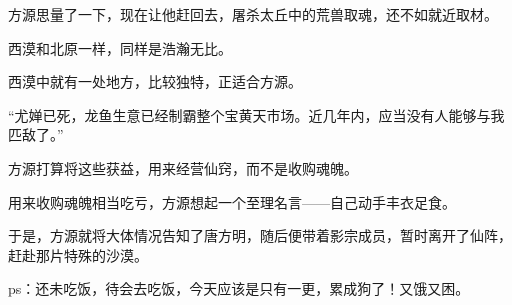 \begin{this_body}
方源思量了一下，现在让他赶回去，屠杀太丘中的荒兽取魂，还不如就近取材。

西漠和北原一样，同样是浩瀚无比。

西漠中就有一处地方，比较独特，正适合方源。

“尤婵已死，龙鱼生意已经制霸整个宝黄天市场。近几年内，应当没有人能够与我匹敌了。”

方源打算将这些获益，用来经营仙窍，而不是收购魂魄。

用来收购魂魄相当吃亏，方源想起一个至理名言——自己动手丰衣足食。

于是，方源就将大体情况告知了唐方明，随后便带着影宗成员，暂时离开了仙阵，赶赴那片特殊的沙漠。

ps：还未吃饭，待会去吃饭，今天应该是只有一更，累成狗了！又饿又困。

\end{this_body}

